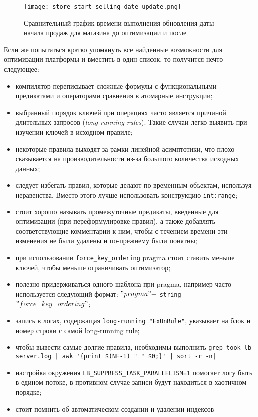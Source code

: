 \begin{figure}
	\centering
	\texttt{[image: store\_start\_selling\_date\_update.png]}
	\caption{Сравнительный график времени выполнения обновления даты начала продаж для магазина до оптимизации и после}
	\label{fig:optimization:notes:store_start_selling_date_update}
\end{figure}

Если же попытаться кратко упомянуть все найденные возможности для оптимизации платформы \LB и вместить в один список, то получится нечто следующее:

\begin{itemize}
  \item компилятор переписывает сложные формулы с функциональными предикатами и операторами сравнения в атомарные инструкции;
  \item выбранный порядок ключей при операциях \join часто является причиной длительных запросов (\emph{long-running rules}). Такие случаи легко выявить при изучении ключей в исходном правиле;
  \item некоторые правила выходят за рамки линейной асимптотики, что плохо сказывается на производительности из-за большого количества исходных данных;
  \item следует избегать правил, которые делают \join по временным объектам, используя неравенства. Вместо этого лучше использовать конструкцию \lstinline{int:range};
  \item стоит хорошо называть промежуточные предикаты, введенные для оптимизации (при переформулировке правил), а также добавлять соответствующие комментарии к ним, чтобы с течением времени эти изменения не были удалены и по-прежнему были понятны;
  \item при использовании \lstinline{force_key_ordering} pragma стоит ставить меньше ключей, чтобы меньше ограничивать оптимизатор;
  \item полезно придерживаться одного шаблона при pragma, например часто используется следующий формат: $"pragma" + $ \lstinline{string} $ +$\linebreak $ "force\_key\_ordering"$;
  \item запись в логах, содержащая \lstinline{long-running "ExUnRule"}, указывает на блок и номер строки с самой long-running rule;
  \item чтобы вывести самые долгие правила, необходимы выполнить \lstinline{grep took lb-server.log |}\lstinline| awk '{print $(NF-1) " " $0;}'|\lstinline{ | sort -r -n|}
  \item настройка окружения \lstinline{LB_SUPPRESS_TASK_PARALLELISM=1} помогает логу быть в едином потоке, в противном случае записи будут находиться в хаотичном порядке;
  \item стоит помнить об автоматическом создании и удалении индексов
\end{itemize}
